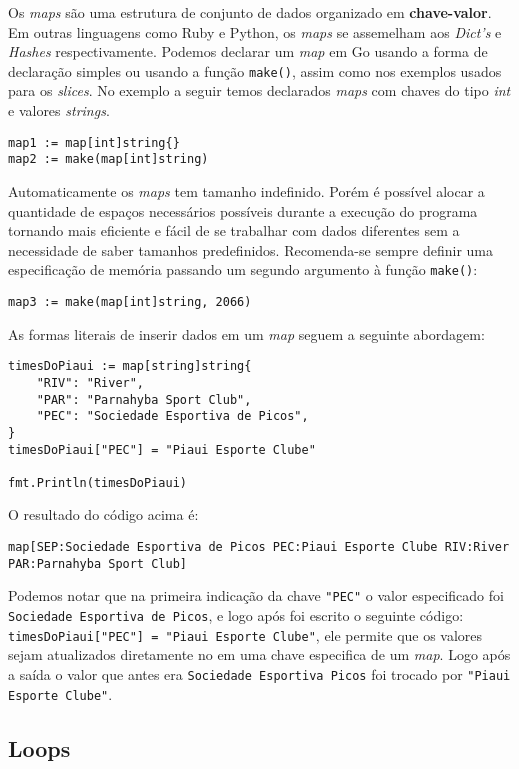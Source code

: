 \documentclass{SBCbookchapter}
\begin{document}
Os \textit{maps} são uma estrutura de conjunto de dados organizado em \textbf{chave-valor}. Em outras linguagens como Ruby e Python, os \textit{maps} se assemelham aos \textit{Dict's} e \textit{Hashes} respectivamente. Podemos declarar um \textit{map} em Go usando a forma de declaração simples ou usando a função \texttt{make()}, assim como nos exemplos usados para os \textit{slices}. No exemplo a seguir temos declarados \textit{maps} com chaves do tipo \textit{int} e valores \textit{strings}.

\begin{lstlisting}
map1 := map[int]string{}
map2 := make(map[int]string)
\end{lstlisting}

Automaticamente os \textit{maps} tem tamanho indefinido. Porém é possível alocar a quantidade de espaços necessários possíveis durante a execução do programa tornando mais eficiente e fácil de se trabalhar com dados diferentes sem a necessidade de saber tamanhos predefinidos. Recomenda-se sempre definir uma especificação de memória passando um segundo argumento à função \texttt{make()}:   

\begin{lstlisting}
map3 := make(map[int]string, 2066)
\end{lstlisting}
As formas literais de inserir dados em um \textit{map} seguem a seguinte abordagem:


\begin{lstlisting}
timesDoPiaui := map[string]string{
	"RIV": "River",
	"PAR": "Parnahyba Sport Club",
	"PEC": "Sociedade Esportiva de Picos",
}
timesDoPiaui["PEC"] = "Piaui Esporte Clube"

fmt.Println(timesDoPiaui)
\end{lstlisting}

O resultado do código acima é:

\noindent\texttt{map[SEP:Sociedade Esportiva de Picos PEC:Piaui Esporte Clube RIV:River PAR:Parnahyba Sport Club]}

Podemos notar que na primeira indicação da chave \texttt{"PEC"} o valor especificado foi \texttt{Sociedade Esportiva de Picos}, e logo após foi escrito o seguinte código: \texttt{timesDoPiaui["PEC"] = "Piaui Esporte Clube"}, ele permite que os valores sejam atualizados diretamente no em uma chave especifica de um \textit{map}. Logo após a saída o valor que antes era \texttt{Sociedade Esportiva Picos} foi trocado por \texttt{"Piaui Esporte Clube"}.
\subsection{Loops}
\end{document}

